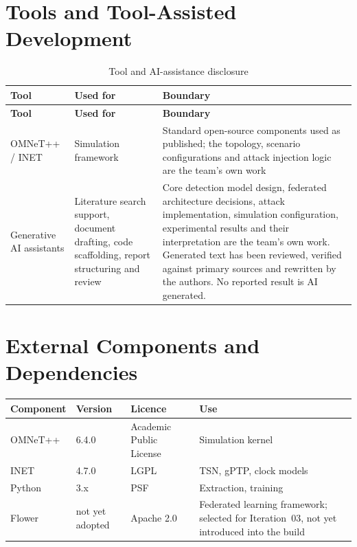 \section{Tools and Tool-Assisted Development}

\begin{longtable}{p{} p{} p{}}
\caption{Tool and AI-assistance disclosure}\\
\toprule
\textbf{Tool} & \textbf{Used for} & \textbf{Boundary} \\
\midrule
\endfirsthead
\toprule
\textbf{Tool} & \textbf{Used for} & \textbf{Boundary} \\
\midrule
\endhead
OMNeT++ / INET & Simulation framework & Standard open-source components used as
published; the topology, scenario configurations and attack injection logic are the
team's own work \\
\addlinespace
Generative AI assistants & Literature search support, document drafting, code
scaffolding, report structuring and review &
Core detection model design, federated architecture decisions, attack
implementation, simulation configuration, experimental results and their
interpretation are the team's own work. Generated text has been reviewed, verified
against primary sources and rewritten by the authors. No reported result is AI
generated. \\
\bottomrule
\end{longtable}


\section{External Components and Dependencies}
\label{sec:dependencies}

\begin{longtable}{p{} p{} p{} p{}}
\toprule
\textbf{Component} & \textbf{Version} & \textbf{Licence} & \textbf{Use} \\
\midrule
\endhead
OMNeT++ & 6.4.0 & Academic Public License & Simulation kernel \\
INET~\cite{inettsn} & 4.7.0 & LGPL & TSN, gPTP, clock models \\
Python & 3.x & PSF & Extraction, training \\
Flower & not yet adopted & Apache 2.0 & Federated learning framework; selected for Iteration~03, not yet introduced into the build \\
\bottomrule
\end{longtable}

